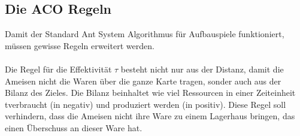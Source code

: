 \documentclass[12pt]{article}
\begin{document}
\subsection{Die ACO Regeln}\label{Regeln}
Damit der Standard Ant System Algorithmus für Aufbauspiele funktioniert, müssen gewisse Regeln erweitert werden. \\\\
Die Regel für die Effektivität $\tau$ besteht nicht nur aus der Distanz, damit die Ameisen nicht die Waren über die ganze Karte tragen, sonder auch aus der Bilanz des Zieles. Die Bilanz beinhaltet wie viel Ressourcen in einer Zeiteinheit t\footnotemark[3] verbraucht (in negativ) und produziert werden (in positiv). Diese Regel soll verhindern, dass die Ameisen nicht ihre Ware zu einem Lagerhaus bringen, das einen Überschuss an dieser Ware hat.
\end{document}
